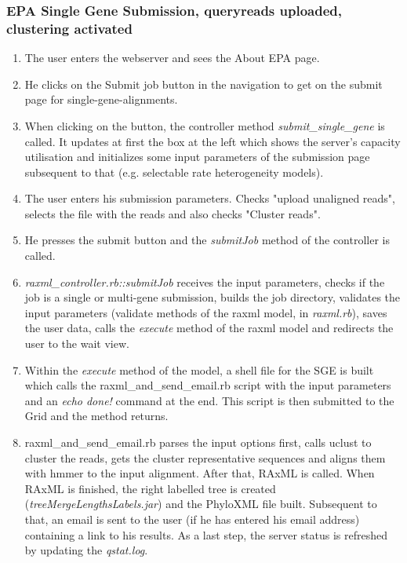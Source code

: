 \documentclass{scrartcl}
\begin{document}
			\subsubsection{EPA Single Gene Submission, queryreads uploaded, clustering activated}
				\begin{enumerate}
					\item The user enters the webserver and sees the About EPA page.
					\item He clicks on the Submit job button in the navigation to get on the submit page for single-gene-alignments.
					\item When clicking on the button, the controller method \textit{submit\_single\_gene} is called. It updates at first the box at the left which shows the server's capacity utilisation and initializes some input parameters of the submission page subsequent to that (e.g. selectable rate heterogeneity models).
					\item The user enters his submission parameters. Checks "upload unaligned reads", selects the file with the reads and also checks "Cluster reads".
					\item He presses the submit button and the \textit{submitJob} method of the controller is called.
					\item \textit{raxml\_controller.rb::submitJob} receives the input parameters, checks if the job is a single or multi-gene submission, builds the job directory, validates the input parameters (validate methods of the raxml model, in \textit{raxml.rb}), saves the user data, calls the \textit{execute} method of the raxml model and redirects the user to the wait view.
					\item Within the \textit{execute} method of the model, a shell file for the SGE is built which calls the raxml\_and\_send\_email.rb script with the input parameters and an \textit{echo done!} command at the end. This script is then submitted to the Grid and the method returns.
					\item raxml\_and\_send\_email.rb parses the input options first, calls uclust to cluster the reads, gets the cluster representative sequences and aligns them with hmmer to the input alignment. After that, RAxML is called. When RAxML is finished, the right labelled tree is created (\textit{treeMergeLengthsLabels.jar}) and the PhyloXML file built. Subsequent to that, an email is sent to the user (if he has entered his email address) containing a link to his results. As a last step, the server status is refreshed by updating the \textit{qstat.log}.

\end{enumerate}
\end{document}
